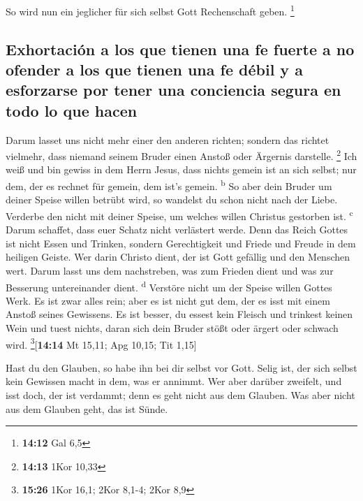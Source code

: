  So wird nun ein jeglicher für sich selbst Gott
Rechenschaft geben. \footnote{\textbf{14:12} Gal 6,5}

\hypertarget{exhortaciuxf3n-a-los-que-tienen-una-fe-fuerte-a-no-ofender-a-los-que-tienen-una-fe-duxe9bil-y-a-esforzarse-por-tener-una-conciencia-segura-en-todo-lo-que-hacen}{%
\subsection{Exhortación a los que tienen una fe fuerte a no ofender a
los que tienen una fe débil y a esforzarse por tener una conciencia
segura en todo lo que
hacen}\label{exhortaciuxf3n-a-los-que-tienen-una-fe-fuerte-a-no-ofender-a-los-que-tienen-una-fe-duxe9bil-y-a-esforzarse-por-tener-una-conciencia-segura-en-todo-lo-que-hacen}}

 Darum lasset uns nicht mehr einer den anderen richten;
sondern das richtet vielmehr, dass niemand seinem Bruder einen Anstoß
oder Ärgernis darstelle. \footnote{\textbf{14:13} 1Kor 10,33}
 Ich weiß und bin gewiss in dem Herrn Jesus, dass nichts
gemein ist an sich selbst; nur dem, der es rechnet für gemein, dem ist's
gemein. \textsuperscript{b}  So aber dein Bruder um
deiner Speise willen betrübt wird, so wandelst du schon nicht nach der
Liebe. Verderbe den nicht mit deiner Speise, um welches willen Christus
gestorben ist. \textsuperscript{c}  Darum schaffet, dass
euer Schatz nicht verlästert werde.  Denn das Reich
Gottes ist nicht Essen und Trinken, sondern Gerechtigkeit und Friede und
Freude in dem heiligen Geiste.  Wer darin Christo dient,
der ist Gott gefällig und den Menschen wert.  Darum lasst
uns dem nachstreben, was zum Frieden dient und was zur Besserung
untereinander dient. \textsuperscript{d}  Verstöre nicht
um der Speise willen Gottes Werk. Es ist zwar alles rein; aber es ist
nicht gut dem, der es isst mit einem Anstoß seines Gewissens.
 Es ist besser, du essest kein Fleisch und trinkest
keinen Wein und tuest nichts, daran sich dein Bruder stößt oder ärgert
oder schwach wird. \footnote{\textbf{15:26} 1Kor 16,1; 2Kor 8,1-4; 2Kor
  8,9}{[}\textbf{14:14} Mt 15,11; Apg 10,15; Tit 1,15{]}

 Hast du den Glauben, so habe ihn bei dir selbst vor
Gott. Selig ist, der sich selbst kein Gewissen macht in dem, was er
annimmt.  Wer aber darüber zweifelt, und isst doch, der
ist verdammt; denn es geht nicht aus dem Glauben. Was aber nicht aus dem
Glauben geht, das ist Sünde.

